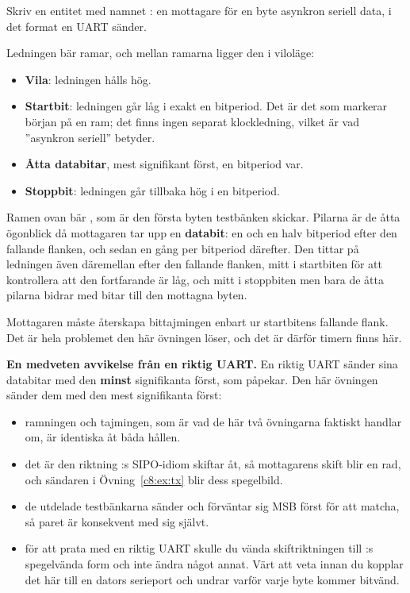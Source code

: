 Skriv en entitet med namnet : en mottagare för en byte asynkron seriell data, i det
format en UART sänder.

Ledningen  bär ramar, och mellan ramarna ligger den i viloläge:
\begin{itemize}
  \item \textbf{Vila}: ledningen hålls hög.
  \item \textbf{Startbit}: ledningen går låg i exakt en bitperiod. Det är det som markerar början på
    en ram; det finns ingen separat klockledning, vilket är vad ”asynkron seriell” betyder.
  \item \textbf{Åtta databitar}, mest signifikant först, en bitperiod var.
  \item \textbf{Stoppbit}: ledningen går tillbaka hög i en bitperiod.
\end{itemize}


Ramen ovan bär , som är den första byten testbänken skickar. Pilarna är de åtta
ögonblick då mottagaren tar upp en \textbf{databit}: en och en halv bitperiod efter den fallande
flanken, och sedan en gång per bitperiod därefter. Den tittar på ledningen även däremellan
\textemdash{} efter den fallande flanken, mitt i startbiten för att kontrollera att den fortfarande
är låg, och mitt i stoppbiten \textemdash{} men bara de åtta pilarna bidrar med bitar till den
mottagna byten.

Mottagaren måste återskapa bittajmingen enbart ur startbitens fallande flank. Det är hela problemet
den här övningen löser, och det är därför timern finns här.

\begin{aside}
\textbf{En medveten avvikelse från en riktig UART.} En riktig UART sänder sina databitar med den
\textbf{minst} signifikanta först, som  påpekar. Den här övningen sänder dem med
den mest signifikanta först:
\begin{itemize}
  \item ramningen och tajmingen, som är vad de här två övningarna faktiskt handlar om, är identiska
    åt båda hållen.
  \item det är den riktning :s SIPO-idiom skiftar åt, så mottagarens skift blir
    en rad, och sändaren i Övning~\ref{c8:ex:tx} blir dess spegelbild.
  \item de utdelade testbänkarna sänder och förväntar sig MSB först för att matcha, så paret är
    konsekvent med sig självt.
  \item för att prata med en riktig UART skulle du vända skiftriktningen till
    :s spegelvända form och inte ändra något annat. Värt att veta innan du
    kopplar det här till en dators serieport och undrar varför varje byte kommer bitvänd.
\end{itemize}
\end{aside}

